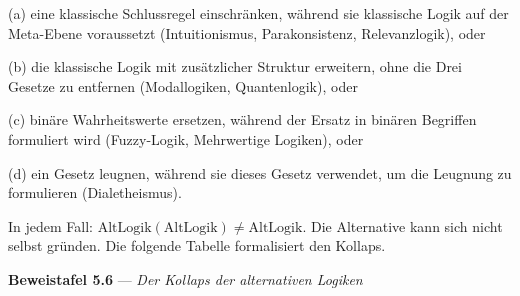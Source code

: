 \documentclass[10pt, openany, oneside]{book}
\begin{document}
\vspace{0.3em}

\noindent (a) eine klassische Schlussregel einschränken, während sie klassische Logik auf der Meta-Ebene voraussetzt (Intuitionismus, Parakonsistenz, Relevanzlogik), oder

\noindent (b) die klassische Logik mit zusätzlicher Struktur erweitern, ohne die Drei Gesetze zu entfernen (Modallogiken, Quantenlogik), oder

\noindent (c) binäre Wahrheitswerte ersetzen, während der Ersatz in binären Begriffen formuliert wird (Fuzzy-Logik, Mehrwertige Logiken), oder

\noindent (d) ein Gesetz leugnen, während sie dieses Gesetz verwendet, um die Leugnung zu formulieren (Dialetheismus).

\vspace{0.3em}

\noindent In jedem Fall: $\text{AltLogik}(\text{AltLogik}) \neq \text{AltLogik}$. Die Alternative kann sich nicht selbst gründen. Die folgende Tabelle formalisiert den Kollaps.

\vspace{0.8em}

\textbf{Beweistafel 5.6} --- \textit{Der Kollaps der alternativen Logiken}

\vspace{0.5em}
\end{document}
